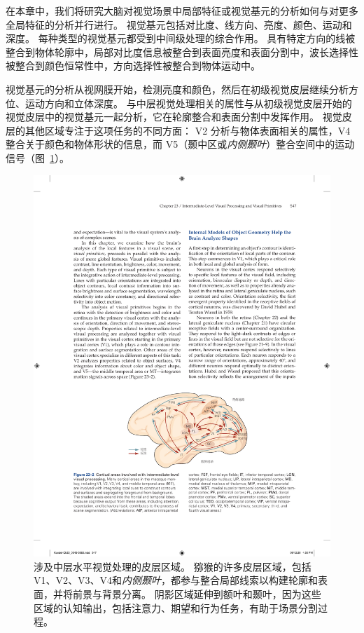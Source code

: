 在本章中，我们将研究大脑对视觉场景中局部特征或视觉基元的分析如何与对更多全局特征的分析并行进行。
视觉基元包括对比度、线方向、亮度、颜色、运动和深度。
每种类型的视觉基元都受到中间级处理的综合作用。
具有特定方向的线被整合到物体轮廓中，局部对比度信息被整合到表面亮度和表面分割中，波长选择性被整合到颜色恒常性中，方向选择性被整合到物体运动中。


视觉基元的分析从视网膜开始，检测亮度和颜色，然后在初级视觉皮层继续分析方位、运动方向和立体深度。
与中层视觉处理相关的属性与从初级视觉皮层开始的视觉皮层中的视觉基元一起分析，它在轮廓整合和表面分割中发挥作用。
视觉皮层的其他区域专注于这项任务的不同方面：
V2 分析与物体表面相关的属性，V4 整合关于颜色和物体形状的信息，而 V5（颞中区或\textit{内侧颞叶}）整合空间中的运动信号（图~\ref{fig:23_2}）。


\begin{figure}[htbp]
	\centering
	\includegraphics[width=0.8\linewidth]{chap23/fig_23_2}
	\caption{涉及中层水平视觉处理的皮层区域。
		猕猴的许多皮层区域，包括V1、V2、V3、V4和\textit{内侧颞叶}，都参与整合局部线索以构建轮廓和表面，并将前景与背景分离。
		阴影区域延伸到额叶和颞叶，因为这些区域的认知输出，包括注意力、期望和行为任务，有助于场景分割过程。}
	\label{fig:23_2}
\end{figure}



